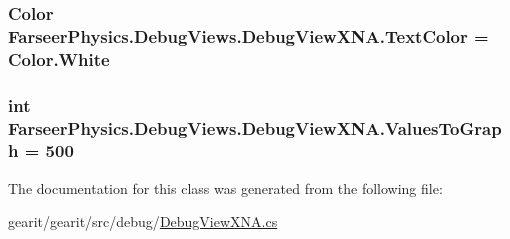 \hypertarget{class_farseer_physics_1_1_debug_views_1_1_debug_view_x_n_a_a6a6df24c4abbe85b2442ddf9f6976155}{
\subsubsection[{Text\+Color}]{\setlength{\rightskip}{0pt plus 5cm}Color Farseer\+Physics.\+Debug\+Views.\+Debug\+View\+X\+N\+A.\+Text\+Color = Color.\+White}}\label{class_farseer_physics_1_1_debug_views_1_1_debug_view_x_n_a_a6a6df24c4abbe85b2442ddf9f6976155}
\hypertarget{class_farseer_physics_1_1_debug_views_1_1_debug_view_x_n_a_a26b28c2306bbad804bcbfc36957f86c6}{
\subsubsection[{Values\+To\+Graph}]{\setlength{\rightskip}{0pt plus 5cm}int Farseer\+Physics.\+Debug\+Views.\+Debug\+View\+X\+N\+A.\+Values\+To\+Graph = 500}}\label{class_farseer_physics_1_1_debug_views_1_1_debug_view_x_n_a_a26b28c2306bbad804bcbfc36957f86c6}


The documentation for this class was generated from the following file\+:\begin{DoxyCompactItemize}
\item 
gearit/gearit/src/debug/\hyperlink{_debug_view_x_n_a_8cs}{Debug\+View\+X\+N\+A.\+cs}\end{DoxyCompactItemize}
